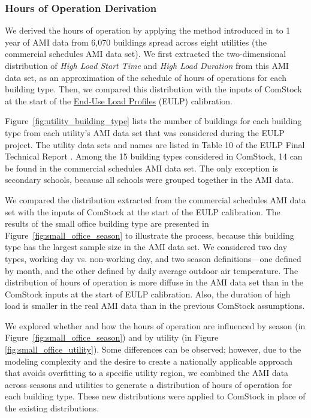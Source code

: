 \subsubsection{Hours of Operation Derivation}
We derived the hours of operation by applying the method introduced in \cite{bianchi2020modeling} to 1 year of AMI data from 6,070 buildings spread across eight utilities (the commercial schedules AMI data set). We first extracted the two-dimensional distribution of \textit{High Load Start Time} and \textit{High Load Duration} from this AMI data set, as an approximation of the schedule of hours of operations for each building type. Then, we compared this distribution with the inputs of ComStock at the start of
 the \href{https://www.nrel.gov/buildings/end-use-load-profiles.html}{End-Use Load Profiles} (EULP) calibration.

Figure~\ref{fig:utility_building_type} lists the number of buildings for each building type from each utility's AMI data set that was considered during the EULP project. The utility data sets and names are listed in Table 10 of the EULP Final Technical Report \citep{eulp_final_report}. Among the 15 building types considered in ComStock, 14 can be found in the commercial schedules AMI data set. The only exception is secondary schools, because all schools were grouped together in the AMI data.

We compared the distribution extracted from the commercial schedules AMI data set with the inputs of ComStock at the start of the EULP calibration. The results of the small office building type are presented in Figure~\ref{fig:small_office_season} to illustrate the process, because this building type has the largest sample size in the AMI data set. We considered two day types, working day vs. non-working day, and two season definitions---one defined by month, and the other defined by daily average outdoor air temperature. The distribution of hours of operation is more diffuse in the AMI data set than in the ComStock inputs at the start of EULP calibration. Also, the duration of high load is smaller in the real AMI data than in the previous ComStock assumptions.

We explored whether and how the hours of operation are influenced by season (in Figure~\ref{fig:small_office_season}) and by utility (in Figure \ref{fig:small_office_utility}). Some differences can be observed; however, due to the modeling complexity and the desire to create a nationally applicable approach that avoids overfitting to a specific utility region, we combined the AMI data across seasons and utilities to generate a distribution of hours of operation for each building type. These new distributions were applied to ComStock in place of the existing distributions.


